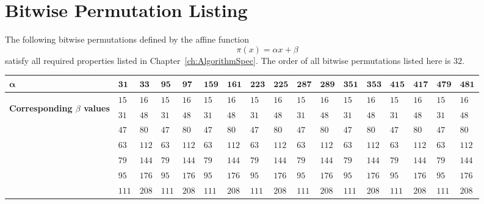 \chapter{Bitwise Permutation Listing}
\label{appx:BitwisePermutations}
The following bitwise permutations defined by the affine function
\begin{equation*}
\pi(x) = \alpha x + \beta
\end{equation*}
satisfy all required properties listed in Chapter~\ref{ch:AlgorithmSpec}.
The order of all bitwise permutations listed here is $32$.

\begin{table}[h]
\footnotesize
\begin{tabular}{l|l|l|l|l|l|l|l|l|l|l|l|l|l|l|l|l}
\normalsize $\mathbf{\alpha}$ &   $\mathbf{31}$ &   $\mathbf{33}$ &   $\mathbf{95}$ &   $\mathbf{97}$ &  $\mathbf{159}$ &  $\mathbf{161}$ &  $\mathbf{223}$ &  $\mathbf{225}$ &  $\mathbf{287}$ &  $\mathbf{289}$ &  $\mathbf{351}$ &  $\mathbf{353}$ &  $\mathbf{415}$ & $\mathbf{417}$ &  $\mathbf{479}$ &  $\mathbf{481}$ \\
\hline
\multirow{32}{*}{\begin{sideways}\normalsize \textbf{Corresponding $\beta$ values}\end{sideways}}
&   $15$ &   $16$ &   $15$ &   $16$ &   $15$ &   $16$ &   $15$ &   $16$ &   $15$ &   $16$ &   $15$ &   $16$ &   $15$ &   $16$ &   $15$ &   $16$ \\
&   $31$ &   $48$ &   $31$ &   $48$ &   $31$ &   $48$ &   $31$ &   $48$ &   $31$ &   $48$ &   $31$ &   $48$ &   $31$ &   $48$ &   $31$ &   $48$ \\
&   $47$ &   $80$ &   $47$ &   $80$ &   $47$ &   $80$ &   $47$ &   $80$ &   $47$ &   $80$ &   $47$ &   $80$ &   $47$ &   $80$ &   $47$ &   $80$ \\
&   $63$ &  $112$ &   $63$ &  $112$ &   $63$ &  $112$ &   $63$ &  $112$ &   $63$ &  $112$ &   $63$ &  $112$ &   $63$ &  $112$ &   $63$ &  $112$ \\
&   $79$ &  $144$ &   $79$ &  $144$ &   $79$ &  $144$ &   $79$ &  $144$ &   $79$ &  $144$ &   $79$ &  $144$ &   $79$ &  $144$ &   $79$ &  $144$ \\
&   $95$ &  $176$ &   $95$ &  $176$ &   $95$ &  $176$ &   $95$ &  $176$ &   $95$ &  $176$ &   $95$ &  $176$ &   $95$ &  $176$ &   $95$ &  $176$ \\
&  $111$ &  $208$ &  $111$ &  $208$ &  $111$ &  $208$ &  $111$ &  $208$ &  $111$ &  $208$ &  $111$ &  $208$ &  $111$ &  $208$ &  $111$ &  $208$ \\

\end{tabular}
\end{table}
